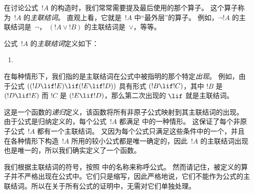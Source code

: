 \documentclass[../../../include/open-logic-section]{subfiles}
\begin{document}


\begin{explain}
在讨论公式~$!A$ 的构造时，我们常常需要提及最后使用的那个算子。
这个算子称为~$!A$ 的\emph{主联结词}。
直观上看，它就是~$!A$ 中“最外层”的算子。
例如，$\lnot !A$ 的主联结词是~$\lnot$，
$(!A \lor !B)$ 的主联结词是~$\lor$，等等。
\end{explain}

\begin{defn}[主联结词]
公式~$!A$ 的\emph{主联结词}定义如下：
\begin{enumerate}
\item {}







\end{enumerate}
\end{defn}

在每种情形下，我们指的是主联结词在公式中被指明的那个特定\emph{出现}。
例如，由于公式
$((!D \lif !E) \lif (!E \lif !D))$
具有形式 $(!B \lif !C)$，其中 $!B$ 是 $(!D \lif !E)$ 而 $!C$ 是 $(!E \lif !D)$，那么第二次出现的 $\lif$ 就是主联结词。

\begin{explain}
这是一个函数的\emph{递归}定义，该函数将所有非原子公式映射到其主联结词的出现。
由于公式是归纳定义的，每个公式~$!A$ 都满足  中的一种情形。
这保证了每个非原子公式~$!A$ 都有一个主联结词。
又因为每个公式只满足这些条件中的一个，并且在各种情形下构造~$!A$ 所用的较小公式都是唯一确定的，因此~$!A$ 的主联结词出现也是唯一的，所以我们确实定义了一个函数。
\end{explain}

我们根据主联结词的符号，按照  中的名称来称呼公式。
{然而请记住，被定义的算子并不严格出现在公式中。它们只是缩写，因此严格地说，它们不能作为公式的主联结词。所以在关于所有公式的证明中，无需对它们单独处理。}
\end{document}
